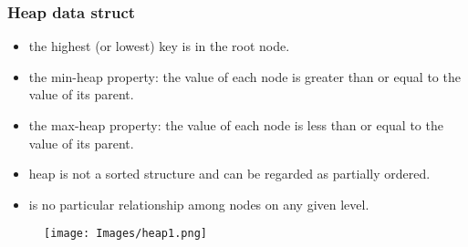 \documentclass{beamer}
\begin{document}

\begin{frame}
\frametitle{Heap data struct}
\begin{itemize}
\item the highest (or lowest) key is in the root node.
\item the min-heap property: the value of each node is greater than or equal to the value of its parent.
\item the max-heap property: the value of each node is less than or equal to the value of its parent.
\item heap is not a sorted structure and can be regarded as partially ordered.
\item is no particular relationship among nodes on any given level.
\end{itemize}
\begin{figure}[h]
\texttt{[image: Images/heap1.png]}
\centering
\end{figure}
\end{frame}
\end{document}
